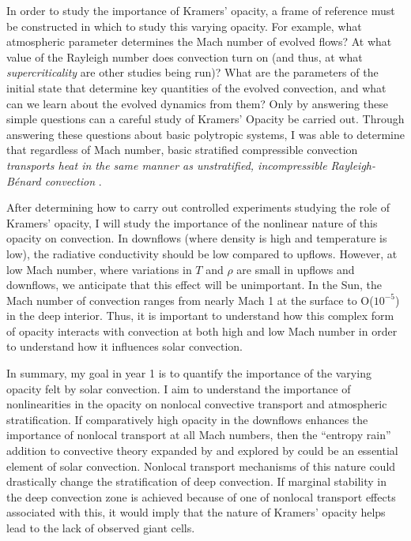\documentclass[aasms,12pt]{article}
\newcommand{\RB}{Rayleigh-B\'{e}nard }
\begin{document}
In order to study the importance of Kramers' opacity, a frame of reference must be constructed
in which to study this varying opacity. For example, what atmospheric parameter determines the Mach number
of evolved flows?  At what value of the Rayleigh number
does convection turn on (and thus, at what \emph{supercriticality} are other studies
being run)?  What are the parameters of the initial state that determine key quantities
of the evolved convection, and what can we learn about the evolved dynamics from them?
Only by answering these simple questions can a careful study of Kramers' Opacity be carried out.
Through answering these questions about basic polytropic systems, I was able to determine that
regardless of Mach number, basic stratified compressible convection \emph{transports heat
in the same manner as unstratified, incompressible \RB convection} \citep{anders&brown2017}.

After determining how to carry out controlled experiments studying the role of Kramers' opacity,
I will study the importance of the nonlinear nature of this opacity on convection.
In downflows (where density is high and temperature is low), the radiative conductivity
should be low compared to upflows.
However, at low Mach number, where variations in $T$ and $\rho$ are small
in upflows and downflows, we anticipate that this effect will be unimportant.  In the Sun,
the Mach number of convection ranges from nearly Mach 1 at the surface to O($10^{-5}$) in the
deep interior.  Thus, it is important to understand how this
complex form of opacity interacts with convection at both high and low Mach number in order to understand
how it influences solar convection.

In summary, my goal in year 1 is to quantify the importance of the varying opacity felt by
solar convection. I aim to understand the importance of
nonlinearities in the opacity on nonlocal convective transport and atmospheric stratification.  If
comparatively high opacity in the downflows enhances the importance of nonlocal transport at
all Mach numbers, then the ``entropy rain'' addition to convective theory expanded by
\cite{brandenburg2016} and explored by \cite{kapyla&all2017} could be an essential element
of solar convection.  Nonlocal transport mechanisms of this nature 
could drastically change the stratification of deep convection. If marginal stability in the deep 
convection zone is achieved because of one of nonlocal transport effects associated with this,
it would imply that the nature of Kramers' opacity helps lead to the lack of observed giant cells.
\end{document}
